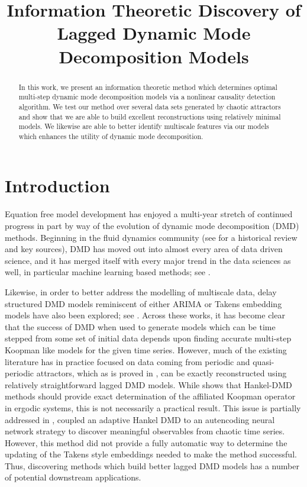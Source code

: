 \documentclass[a4paper,11pt]{article}
\title{Information Theoretic Discovery of Lagged Dynamic Mode Decomposition Models}
\date{}
\begin{document}
\maketitle

\begin{abstract}
In this work, we present an information theoretic method which determines optimal multi-step dynamic mode decomposition models via a nonlinear causality detection algorithm.  We test our method over several data sets generated by chaotic attractors and show that we are able to build excellent reconstructions using relatively minimal models.  We likewise are able to better identify multiscale features via our models which enhances the utility of dynamic mode decomposition.   
\end{abstract}

\section{Introduction}

Equation free model development has enjoyed a multi-year stretch of continued progress in part by way of the evolution of dynamic mode decomposition (DMD) methods.  Beginning in the fluid dynamics community (see \cite{taira} for a historical review and key sources), DMD has moved out into almost every area of data driven science, and it has merged itself with every major trend in the data sciences as well, in particular machine learning based methods; see \cite{lusch, azencot, lago_dldmd}.  

Likewise, in order to better address the modelling of multiscale data, delay structured DMD models reminiscent of either ARIMA or Takens embedding models have also been explored; see \cite{arbabi, clainche, duraisamy, champion2, kutz4, curtis_dldmd}.  Across these works, it has become clear that the success of DMD when used to generate models which can be time stepped from some set of initial data depends upon finding accurate multi-step Koopman like models for the given time series.  However, much of the existing literature has in practice focused on data coming from periodic and quasi-periodic attractors, which as is proved in \cite{duraisamy}, can be exactly reconstructed using relatively straightforward lagged DMD models.  While \cite{arbabi} shows that Hankel-DMD methods should provide exact determination of the affiliated Koopman operator in ergodic systems, this is not necessarily a practical result.  This issue is partially addressed in \cite{curtis_dldmd}, coupled an adaptive Hankel DMD to an autencoding neural network strategy to discover meaningful observables from chaotic time series.  However, this method did not provide a fully automatic way to determine the updating of the Takens style embeddings needed to make the method successful.  Thus, discovering methods which build better lagged DMD models has a number of potential downstream applications.  
\end{document}
